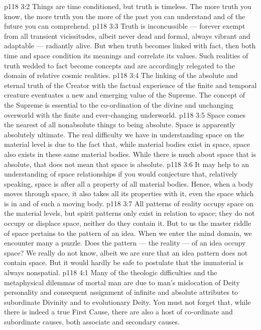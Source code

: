 \vs p118 3:2 \pc Things are time conditioned, but truth is timeless. The more truth you know, the more truth you  the more of the past you can understand and of the future you can comprehend.
\vs p118 3:3 Truth is inconcussible --- forever exempt from all transient vicissitudes, albeit never dead and formal, always vibrant and adaptable --- radiantly alive. But when truth becomes linked with fact, then both time and space condition its meanings and correlate its values. Such realities of truth wedded to fact become concepts and are accordingly relegated to the domain of relative cosmic realities.
\vs p118 3:4 The linking of the absolute and eternal truth of the Creator with the factual experience of the finite and temporal creature eventuates a new and emerging value of the Supreme. The concept of the Supreme is essential to the co\hyp{}ordination of the divine and unchanging overworld with the finite and ever\hyp{}changing underworld.
\vs p118 3:5 \pc Space comes the nearest of all nonabsolute things to being absolute. Space is apparently absolutely ultimate. The real difficulty we have in understanding space on the material level is due to the fact that, while material bodies exist in space, space also exists in these same material bodies. While there is much about space that is absolute, that does not mean that space is absolute.
\vs p118 3:6 It may help to an understanding of space relationships if you would conjecture that, relatively speaking, space is after all a property of all material bodies. Hence, when a body moves through space, it also takes all its properties with it, even the space which is in and of such a moving body.
\vs p118 3:7 All patterns of reality occupy space on the material levels, but spirit patterns only exist in relation to space; they do not occupy or displace space, neither do they contain it. But to us the master riddle of space pertains to the pattern of an idea. When we enter the mind domain, we encounter many a puzzle. Does the pattern --- the reality --- of an idea occupy space? We really do not know, albeit we are sure that an idea pattern does not contain space. But it would hardly be safe to postulate that the immaterial is always nonspatial.
\vs p118 4:1 Many of the theologic difficulties and the metaphysical dilemmas of mortal man are due to man’s mislocation of Deity personality and consequent assignment of infinite and absolute attributes to subordinate Divinity and to evolutionary Deity. You must not forget that, while there is indeed a true First Cause, there are also a host of co\hyp{}ordinate and subordinate causes, both associate and secondary causes.
